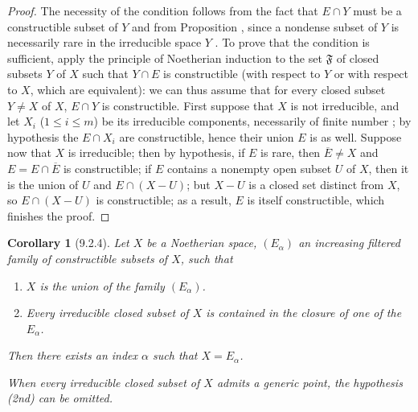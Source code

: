 \documentclass[oneside]{amsart}
\theoremstyle{ega-env-style}
\theoremstyle{ega-thm-env-style}
\newtheorem*{corollary}{Corollary}
\theoremstyle{ega-defn-env-style}
\def\leq{\leqslant}                 %
\def\setmin{-}                      %
\let\EGAOriginalLabel\label
\renewcommand{\label}[1]{\phantomsection\EGAOriginalLabel{#1}}
\begin{document}
\begin{proof}
The necessity of the condition follows from the fact that $E\cap Y$ must be a constructible subset of $Y$ and from Proposition , since a nondense subset of $Y$ is necessarily rare in the irreducible space $Y$ .
To prove that the condition is sufficient, apply the principle of Noetherian induction  to the set $\mathfrak{F}$ of closed subsets $Y$ of $X$ such that $Y\cap E$ is constructible (with respect to $Y$ or with respect to $X$, which are equivalent): we can thus assume that for every closed subset $Y\neq X$ of $X$, $E\cap Y$ is constructible.
First suppose that $X$ is not irreducible, and let $X_i$ ($1\leq i\leq m$) be its irreducible components, necessarily of finite number ; by hypothesis the $E\cap X_i$ are constructible, hence their union $E$ is as well.
Suppose now that $X$ is irreducible; then by hypothesis, if $E$ is rare, then $\overline{E}\neq X$ and $E=E\cap\overline{E}$ is constructible; if $E$ contains a nonempty open subset $U$ of $X$, then it is the union of $U$ and $E\cap(X\setmin U)$; but $X\setmin U$ is a closed set distinct from $X$, so $E\cap(X\setmin U)$ is constructible; as a result, $E$ is itself constructible, which finishes the proof.
\end{proof}

\begin{corollary}[9.2.4]
\label{0.9.2.4}
Let $X$ be a Noetherian space, $(E_\alpha)$ an increasing filtered family of constructible subsets of $X$, such that
\begin{enumerate}
  \item[\emph{(1st)}] $X$ is the union of the family $(E_\alpha)$.
  \item[\emph{(2nd)}] Every irreducible closed subset of $X$ is contained in the closure of one of the $E_\alpha$.
\end{enumerate}

Then there exists an index $\alpha$ such that $X=E_\alpha$.

When every irreducible closed subset of $X$ admits a generic point, the hypothesis \emph{(2nd)} can be omitted.
\end{corollary}
\end{document}

